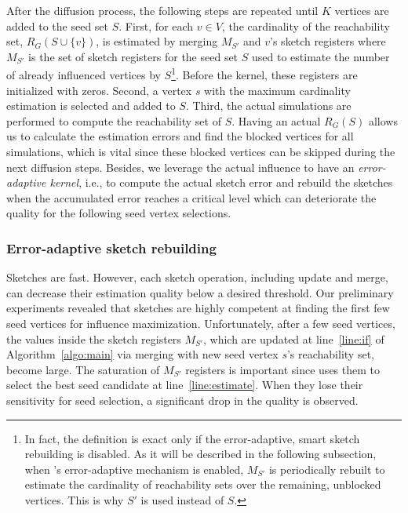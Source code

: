After the diffusion process, the following steps are repeated until $K$ vertices are added to the seed set $S$. First, for each $v \in V$, the cardinality of the reachability set, $R_G(S \cup \{v\})$, is estimated by merging $M_{S'}$ and $v$'s sketch registers where $M_{S'}$ is the set of sketch registers for the seed set $S$ used to estimate the number of already influenced vertices by $S$\footnote{In fact, the definition is exact only if the error-adaptive, smart sketch rebuilding is disabled. As it will be described in the following subsection, when \acro's error-adaptive mechanism is enabled, $M_{S'}$ is periodically rebuilt to estimate the cardinality of reachability sets over the remaining, unblocked vertices. This is why $S'$ is used instead of $S$.}. Before the kernel, these registers are initialized with zeros. Second, a vertex $s$ with the maximum cardinality estimation is selected and added to $S$. Third, the actual simulations are performed to compute the reachability set of $S$. Having an actual $R_G(S)$ allows us to calculate the estimation errors and find the blocked vertices for all simulations, which is vital since these blocked vertices can be skipped during the next diffusion steps. Besides, we leverage the actual influence to have an {\em error-adaptive kernel}, i.e., to compute the actual sketch error and rebuild the sketches when the accumulated error reaches a critical level which can deteriorate the quality for the following seed vertex selections.

\subsubsection{Error-adaptive sketch rebuilding}

Sketches are fast. However, each sketch operation, including update and merge, can decrease their estimation quality below a desired threshold. Our preliminary experiments revealed that sketches are highly competent at finding the first few seed vertices for influence maximization. Unfortunately, after a few seed vertices, the values inside the sketch registers $M_{S'}$, which are updated at line~\ref{line:if} of Algorithm~\ref{algo:main} via merging with new seed vertex $s$'s reachability set, become large. The saturation of $M_{S'}$ registers is important since \acro uses them to select the best seed candidate at line~\ref{line:estimate}. When they lose their sensitivity for seed selection, a significant drop in the quality is observed. 

